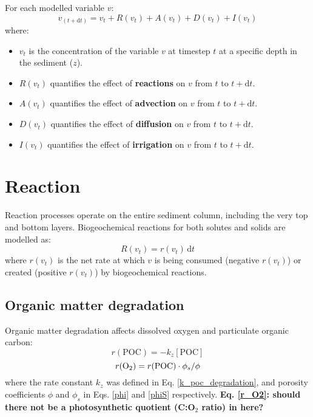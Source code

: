 \documentclass[a4paper]{article}
\newcommand{\D}[1]{\mathrm{d}#1}
\newcommand{\wtf}[1]{\textcolor{Cerulean}{\textbf{#1}}}
\begin{document}
For each modelled variable $v$:
\begin{equation}
v_{(t+\D{t})} = v_t + R(v_t) + A(v_t) + D(v_t) + I(v_t)
\end{equation}
where:
\begin{itemize}
  \item $v_t$ is the concentration of the variable $v$ at timestep $t$ at a specific depth in the sediment ($z$).
  \item $R(v_t)$ quantifies the effect of \textbf{reactions} on $v$ from $t$ to $t+\D{t}$.
  \item $A(v_t)$ quantifies the effect of \textbf{advection} on $v$ from $t$ to $t+\D{t}$.
  \item $D(v_t)$ quantifies the effect of \textbf{diffusion} on $v$ from $t$ to $t+\D{t}$.
  \item $I(v_t)$ quantifies the effect of \textbf{irrigation} on $v$ from $t$ to $t+\D{t}$.
\end{itemize}

\section{Reaction}

Reaction processes operate on the entire sediment column, including the very top and bottom layers. Biogeochemical reactions for both solutes and solids are modelled as:
\begin{equation}
R(v_t) = r(v_t) \, \D{t}
\end{equation}
where $r(v_t)$ is the net rate at which $v$ is being consumed (negative $r(v_t)$) or created (positive $r(v_t)$) by biogeochemical reactions.

\subsection{Organic matter degradation}

Organic matter degradation affects dissolved oxygen and particulate organic carbon:
\begin{equation}
r(\mathrm{POC}) = -k_z [\mathrm{POC}]
\end{equation}
\begin{equation}\label{r_O2}
r(\ce{O2}) = r(\mathrm{POC}) \cdot \phi_s / \phi
\end{equation}
where the rate constant $k_z$ was defined in Eq. \eqref{k_poc_degradation}, and porosity coefficients $\phi$ and $\phi_s$ in Eqs. \eqref{phi} and \eqref{phiS} respectively. \wtf{Eq. \eqref{r_O2}: should there not be a photosynthetic quotient (C:O$_2$ ratio) in here?}
\end{document}
